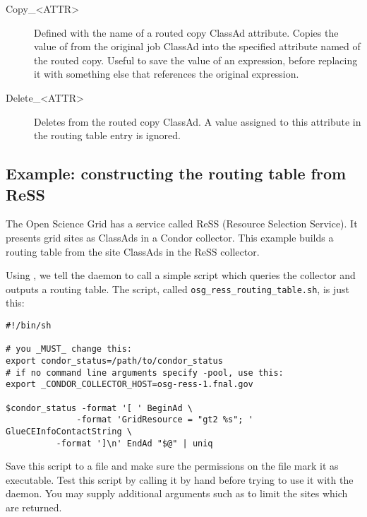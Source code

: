 \begin{description}
\item[Copy\_<ATTR>] Defined with the name of a routed copy ClassAd
attribute. Copies the value of  from the
original job ClassAd into the specified attribute named of the routed copy.
Useful to save the value of an
expression, before replacing it with something else that references the
original expression.

\item[Delete\_<ATTR>] Deletes  from the routed copy
ClassAd.  A value assigned to this attribute in the routing table
entry is ignored.

\end{description}

\subsection{\label{JobRouterReSSExample}Example: constructing the routing table from ReSS}

The Open Science Grid has a service called ReSS (Resource Selection
Service).  It presents grid sites as ClassAds in a Condor collector.
This example builds a routing table from the site ClassAds in the ReSS
collector.

Using , we tell the  daemon to call a
simple script which queries the collector and outputs a routing table.
The script, called \verb|osg_ress_routing_table.sh|, is just this:

\begin{verbatim}
#!/bin/sh

# you _MUST_ change this:
export condor_status=/path/to/condor_status
# if no command line arguments specify -pool, use this:
export _CONDOR_COLLECTOR_HOST=osg-ress-1.fnal.gov

$condor_status -format '[ ' BeginAd \
              -format 'GridResource = "gt2 %s"; ' GlueCEInfoContactString \
	      -format ']\n' EndAd "$@" | uniq
\end{verbatim}

Save this script to a file and make sure the permissions on the file
mark it as executable.  Test this script by calling it by hand before
trying to use it with the \Condor{job\_router} daemon.  You may supply additional arguments
such as \Opt{-constraint} to limit the sites which are returned.

